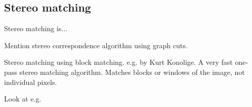 \subsection{Stereo matching}
\label{sec:stereo-prior}

Stereo matching is...

Mention stereo correspondence algorithm using graph cuts.

Stereo matching using block matching. e.g. by Kurt Konolige. A very fast one-pass stereo matching algorithm.
Matches blocks or windows of the image, not individual pixels.

Look at e.g. %

